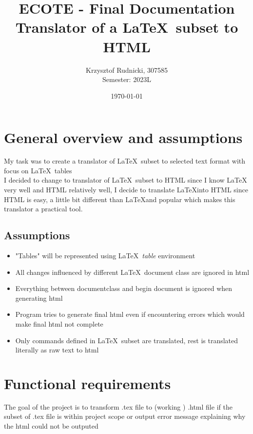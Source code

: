 \documentclass[12pt]{article}
\date{\today}
\title{ECOTE - Final Documentation \\ 
Translator of a \LaTeX \, subset to HTML
}
\author{Krzysztof Rudnicki, 307585 \\
Semester: 2023L}
\begin{document}
\maketitle
\section{General overview and assumptions}
My task was to create a translator of \LaTeX \, subset to selected text format with focus on \LaTeX \, tables \\ 
I decided to change to translator of \LaTeX \, subset to HTML since I know \LaTeX \, very well and HTML relatively well, I decide to translate \LaTeX into HTML since HTML is easy, a little bit different than \LaTeX and popular which makes this translator a practical tool.
\subsection{Assumptions}
\begin{itemize}
    \item "Tables" will be represented using \LaTeX \, \emph{table} environment 
    \item All changes influenced by different \LaTeX \, document class are ignored in html 
    \item Everything between documentclass and begin document is ignored when generating html
    \item Program tries to generate final html even if encountering errors which would make final html not complete
    \item Only commands defined in \LaTeX \, subset are translated, rest is translated literally as raw text to html
\end{itemize}
\section{Functional requirements}
The goal of the project is to transform .tex file to (working ) .html file if the subset of .tex file is within project scope or output error message explaining why the html could not be outputed
\end{document}
